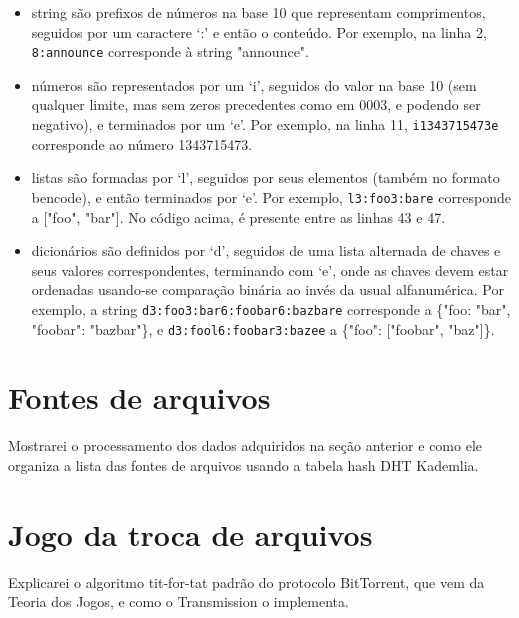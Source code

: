 \begin{itemize}
    \item \gls*{string} são prefixos de números na base 10 que representam
        comprimentos, seguidos por um caractere `:' e então o conteúdo. Por exemplo, na
        linha 2, \verb|8:announce| corresponde à \gls*{string} "announce".

    \item números são representados por um `i', seguidos do valor na base 10 (sem
        qualquer limite, mas sem zeros precedentes como em $0003$, e podendo ser
        negativo), e terminados por um `e'. Por exemplo, na linha 11,
        \verb|i1343715473e| corresponde ao número 1343715473.

    \item listas são formadas por `l', seguidos por seus elementos (também no formato
        \gls*{bencode}), e então terminados por `e'. Por exemplo, \verb|l3:foo3:bare|
        corresponde a ["foo", "bar"]. No código acima, é presente entre as linhas 43
        e 47.

    \item dicionários são definidos por `d', seguidos de uma lista alternada de chaves e
        seus valores correspondentes, terminando com `e', onde as chaves devem estar
        ordenadas usando-se comparação binária ao invés da usual alfanumérica.
        Por exemplo, a \gls*{string} \verb|d3:foo3:bar6:foobar6:bazbare| corresponde a
        \{"foo: "bar", "foobar": "bazbar"\}, e \verb|d3:fool6:foobar3:bazee| a
        \{"foo": ["foobar", "baz"]\}.
\end{itemize}


\section{Fontes de arquivos}

Mostrarei o processamento dos dados adquiridos na seção anterior e como ele organiza a lista das fontes de arquivos usando a tabela hash DHT Kademlia.

\section{Jogo da troca de arquivos}

Explicarei o algoritmo tit-for-tat padrão do protocolo BitTorrent, que vem da Teoria dos Jogos, e como o Transmission o implementa.

\afterpage{\clearpage}